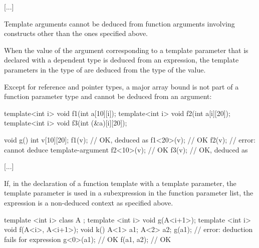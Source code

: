 \documentclass{wg21}
\begin{document}
\textcolor{noteclr}{[...]}

\pnum
Template arguments cannot be deduced from function arguments involving
constructs other than the ones specified above.

\pnum
When the value of the argument
corresponding to a  template parameter 
that is declared with a dependent type
is deduced from an expression,
the template parameters in the type of 
are deduced from the type of the value.


\pnum
\begin{note}
Except for reference and pointer types, a major array bound is not part of a
function parameter type and cannot be deduced from an argument:
\begin{codeblock}
    template<int i> void f1(int a[10][i]);
    template<int i> void f2(int a[i][20]);
    template<int i> void f3(int (&a)[i][20]);

    void g() {
        int v[10][20];
        f1(v);                        // OK,  deduced as 
        f1<20>(v);                    // OK
        f2(v);                        // error: cannot deduce template-argument 
        f2<10>(v);                    // OK
        f3(v);                        // OK,  deduced as 
    }
\end{codeblock}
\end{note}

\textcolor{noteclr}{[...]}

\pnum
\begin{note}
If, in the declaration of a function template with a 
template parameter, the  template parameter
is used in a subexpression in the function parameter list,
the expression is a non-deduced context as specified above.
\begin{example}
    \begin{codeblock}
        template <int i> class A { };
        template <int i> void g(A<i+1>);
        template <int i> void f(A<i>, A<i+1>);
        void k() {
            A<1> a1;
            A<2> a2;
            g(a1);                        // error: deduction fails for expression 
            g<0>(a1);                     // OK
            f(a1, a2);                    // OK
        }
    \end{codeblock}
\end{example}
\end{note}
\end{document}
